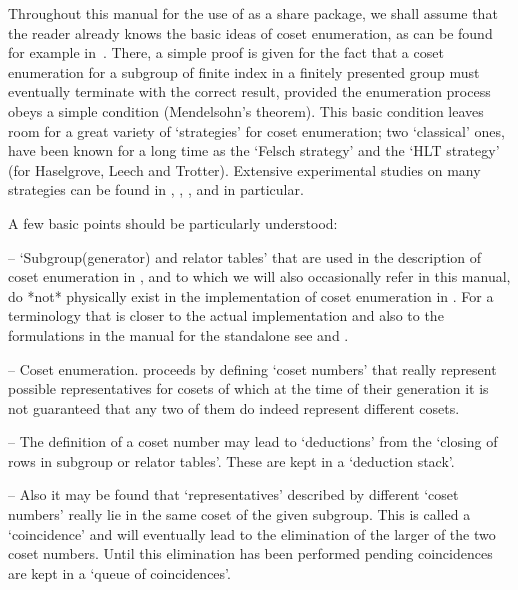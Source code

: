 Throughout this manual for the use of {\ACE} as a {\GAP} share package,
we shall assume that the reader already knows the basic ideas of coset
enumeration,  as  can be  found  for  example in~\cite{Neu82}.  There,
a  simple  proof  is  given  for the fact that a coset enumeration for
a  subgroup  of  finite  index  in a  finitely  presented  group  must
eventually terminate with the correct result, provided the enumeration
process obeys  a simple  condition (Mendelsohn's theorem).  This basic
condition leaves room for a great variety of \lq strategies' for coset
enumeration; two \lq classical' ones, have been known for a long  time
as the \lq Felsch  strategy' and the \lq HLT strategy' (for Haselgrove,
Leech  and Trotter). Extensive experimental studies on many strategies
can  be  found  in \cite{CDHW73},  \cite{Hav91}, \cite{HR99a},
and \cite{HR99b} in particular.

A few basic points  should be particularly understood:

\beginlist

\item{--} \lq Subgroup(generator) and relator tables' that are used in
the description of coset enumeration  in \cite{Neu82}, and to which we
will  also occasionally  refer in  this manual,   do  *not* physically
exist    in the implementation of  coset enumeration in {\ACE}.  For a
terminology that  is closer to  the actual implementation and  also to
the  formulations  in  the   manual  for  the  {\ACE}  standalone  see
\cite{CDHW73} and \cite{Hav91}.

\item{--} Coset  enumeration. proceeds  by defining \lq coset numbers' 
that really represent possible representatives for cosets of  which at
the time of their generation it is not guaranteed that any two of them
do indeed represent different cosets.

\item{--} The definition of a coset number may lead to \lq deductions'
from the \lq closing of rows in subgroup or relator tables'. These are
kept in a \lq deduction stack'.

\item{--}  Also it may be found that \lq representatives' described by
different \lq coset  numbers' really lie in the same coset of the given
subgroup. This is called a \lq coincidence' and will eventually lead to
the elimination  of the larger of  the two coset  numbers.  Until this
elimination  has been  performed pending  coincidences are  kept  in a
\lq queue of coincidences'.

